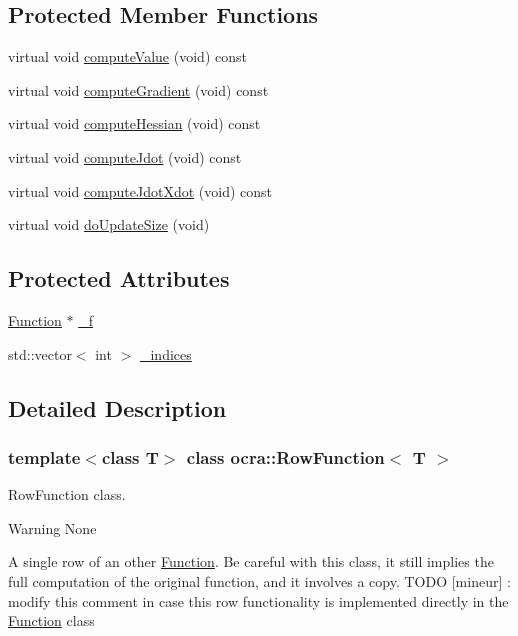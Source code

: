 \subsection*{Protected Member Functions}
\begin{DoxyCompactItemize}
\item 
virtual void \hyperlink{classocra_1_1RowFunction_a99dfb80d85d71b217b49c9ef22dcd361}{compute\+Value} (void) const
\item 
virtual void \hyperlink{classocra_1_1RowFunction_a3d32e6e76f2f4aed5630e0a59cf08756}{compute\+Gradient} (void) const
\item 
virtual void \hyperlink{classocra_1_1RowFunction_ab9d6a1f29d2a3756700e2200d402b4fb}{compute\+Hessian} (void) const
\item 
virtual void \hyperlink{classocra_1_1RowFunction_a1ec66fcc1c35b323c38f3798f2439172}{compute\+Jdot} (void) const
\item 
virtual void \hyperlink{classocra_1_1RowFunction_a6e6009f89040ce403c6b1463dc82b29d}{compute\+Jdot\+Xdot} (void) const
\item 
virtual void \hyperlink{classocra_1_1RowFunction_ae2072d38459752174b456af8497da969}{do\+Update\+Size} (void)
\end{DoxyCompactItemize}
\subsection*{Protected Attributes}
\begin{DoxyCompactItemize}
\item 
\hyperlink{classocra_1_1Function}{Function} $\ast$ \hyperlink{classocra_1_1RowFunction_a336ba922ce93c2c1357b4298acfd0c2b}{\+\_\+f}
\item 
std\+::vector$<$ int $>$ \hyperlink{classocra_1_1RowFunction_afaa713596ca3c785cd9bb7599518ab0e}{\+\_\+indices}
\end{DoxyCompactItemize}


\subsection{Detailed Description}
\subsubsection*{template$<$class T$>$\newline
class ocra\+::\+Row\+Function$<$ T $>$}

Row\+Function class. 

\begin{DoxyWarning}{Warning}
None
\end{DoxyWarning}
A single row of an other \hyperlink{classocra_1_1Function}{Function}. Be careful with this class, it still implies the full computation of the original function, and it involves a copy. T\+O\+DO \mbox{[}mineur\mbox{]} \+: modify this comment in case this row functionality is implemented directly in the \hyperlink{classocra_1_1Function}{Function} class 

